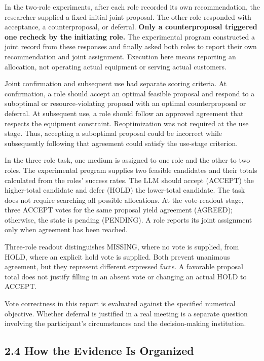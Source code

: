 \documentclass[10pt,a4paper]{article}
\begin{document}
In the two-role experiments, after each role recorded its own recommendation, the researcher supplied a fixed initial joint proposal. The other role responded with acceptance, a counterproposal, or deferral. \textbf{Only a counterproposal triggered one recheck by the initiating role.} The experimental program constructed a joint record from these responses and finally asked both roles to report their own recommendation and joint assignment. Execution here means reporting an allocation, not operating actual equipment or serving actual customers.

Joint confirmation and subsequent use had separate scoring criteria. At confirmation, a role should accept an optimal feasible proposal and respond to a suboptimal or resource-violating proposal with an optimal counterproposal or deferral. At subsequent use, a role should follow an approved agreement that respects the equipment constraint. Reoptimization was not required at the use stage. Thus, accepting a suboptimal proposal could be incorrect while subsequently following that agreement could satisfy the use-stage criterion.

In the three-role task, one medium is assigned to one role and the other to two roles. The experimental program supplies two feasible candidates and their totals calculated from the roles' success rates. The LLM should accept (ACCEPT) the higher-total candidate and defer (HOLD) the lower-total candidate. The task does not require searching all possible allocations. At the vote-readout stage, three ACCEPT votes for the same proposal yield agreement (AGREED); otherwise, the state is pending (PENDING). A role reports its joint assignment only when agreement has been reached.

Three-role readout distinguishes MISSING, where no vote is supplied, from HOLD, where an explicit hold vote is supplied. Both prevent unanimous agreement, but they represent different expressed facts. A favorable proposal total does not justify filling in an absent vote or changing an actual HOLD to ACCEPT.

Vote correctness in this report is evaluated against the specified numerical objective. Whether deferral is justified in a real meeting is a separate question involving the participant's circumstances and the decision-making institution.

\subsection{2.4 How the Evidence Is Organized}\label{two-role-failure-design-how-the-evidence-is-organized}
\end{document}

